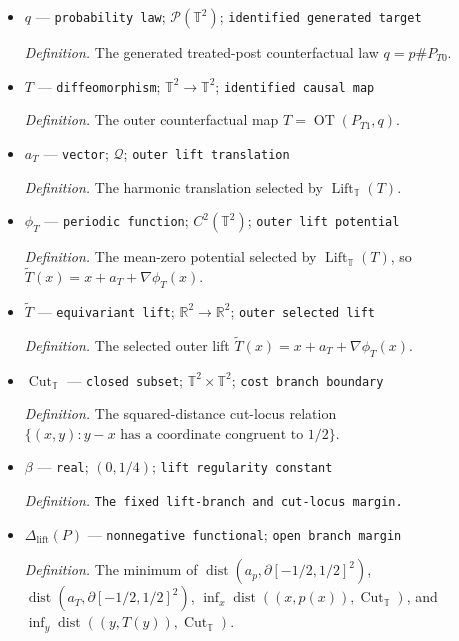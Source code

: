\documentclass{article}
\begin{document}
\begin{itemize}
  \par\smallskip\noindent\emph{Definition.} The selected inner lift \(\widetilde p(x)=x+a_p+\nabla\phi_p(x)\).
  \item \(q\) --- \texttt{probability law}; \(\mathcal P(\mathbb T^2)\); \texttt{identified generated target}
  \par\smallskip\noindent\emph{Definition.} The generated treated-post counterfactual law \(q=p\#P_{T0}\).
  \item \(T\) --- \texttt{diffeomorphism}; \(\mathbb T^2\to\mathbb T^2\); \texttt{identified causal map}
  \par\smallskip\noindent\emph{Definition.} The outer counterfactual map \(T=\operatorname{OT}(P_{T1},q)\).
  \item \(a_T\) --- \texttt{vector}; \(\mathcal Q\); \texttt{outer lift translation}
  \par\smallskip\noindent\emph{Definition.} The harmonic translation selected by \(\operatorname{Lift}_{\mathbb T}(T)\).
  \item \(\phi_T\) --- \texttt{periodic function}; \(C^2(\mathbb T^2)\); \texttt{outer lift potential}
  \par\smallskip\noindent\emph{Definition.} The mean-zero potential selected by \(\operatorname{Lift}_{\mathbb T}(T)\), so \(\widetilde T(x)=x+a_T+\nabla\phi_T(x)\).
  \item \(\widetilde T\) --- \texttt{equivariant lift}; \(\mathbb R^2\to\mathbb R^2\); \texttt{outer selected lift}
  \par\smallskip\noindent\emph{Definition.} The selected outer lift \(\widetilde T(x)=x+a_T+\nabla\phi_T(x)\).
  \item \(\operatorname{Cut}_{\mathbb T}\) --- \texttt{closed subset}; \(\mathbb T^2\times\mathbb T^2\); \texttt{cost branch boundary}
  \par\smallskip\noindent\emph{Definition.} The squared-distance cut-locus relation \(\{(x,y):y-x\text{ has a coordinate congruent to }1/2\}\).
  \item \(\beta\) --- \texttt{real}; \((0,1/4)\); \texttt{lift regularity constant}
  \par\smallskip\noindent\emph{Definition.} \texttt{The fixed lift-\allowbreak{}branch and cut-\allowbreak{}locus margin.}
  \item \(\Delta_{\mathrm{lift}}(P)\) --- \texttt{nonnegative functional}; \texttt{open branch margin}
  \par\smallskip\noindent\emph{Definition.} The minimum of \(\operatorname{dist}(a_p,\partial[-1/2,1/2]^2)\), \(\operatorname{dist}(a_T,\partial[-1/2,1/2]^2)\), \(\inf_x\operatorname{dist}((x,p(x)),\operatorname{Cut}_{\mathbb T})\), and \(\inf_y\operatorname{dist}((y,T(y)),\operatorname{Cut}_{\mathbb T})\).

\end{itemize}
\end{document}
